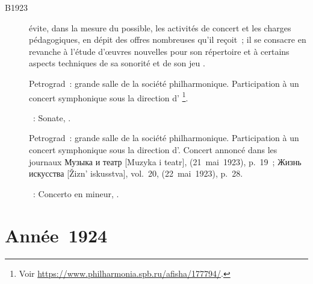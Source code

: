 \begin{description}
 \item[B1923]
 \VSofronitsky{} évite, dans la mesure du possible, les activités de concert
 et les charges pédagogiques, en dépit des offres nombreuses qu'il reçoit~;
 il se consacre en revanche à l'étude d'œuvres nouvelles pour son répertoire
 et à certains aspects techniques de sa sonorité et de son jeu
 \citep[voir][p.~28]{Sofronitsky82a}.
 \item[]
 Petrograd~: grande salle de la société philharmonique.
 Participation à un concert symphonique sous la direction d'\ECooper{}%
 \footnote{Voir \href{https://www.philharmonia.spb.ru/afisha/177794/}%
 {https://www.philharmonia.spb.ru/afisha/177794/}.}.

 \textsc{\Scriabine{}}~: Sonate, .
 \item[]
 Petrograd~: grande salle de la société philharmonique.
 Participation à un concert symphonique sous la direction d'\ECooper{}.
 Concert annoncé dans les journaux \foreignlanguage{russian}{Музыка и театр}
 [Muzyka i teatr],  (21~mai~1923), p.~19~;
 \foreignlanguage{russian}{Жизнь искусства} [Žizn' iskusstva], vol.~20,
  (22~mai~1923), p.~28.

 \textsc{\Scriabine{}}~: Concerto en \kF \Sharp mineur, .
\end{description}

\section{Année~1924}

